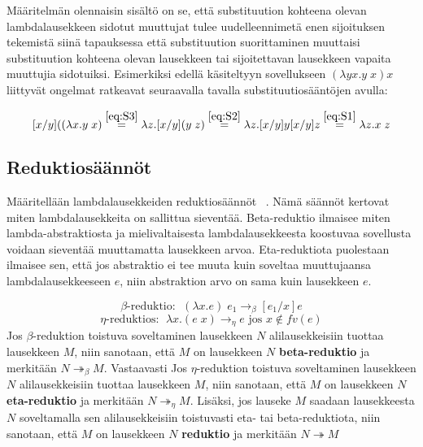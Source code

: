 Määritelmän olennaisin sisältö on se, että substituution kohteena olevan lambdalausekkeen sidotut muuttujat tulee uudelleennimetä enen sijoituksen tekemistä siinä tapauksessa että substituution suorittaminen muuttaisi substituution kohteena olevan lausekkeen tai sijoitettavan lausekkeen vapaita muuttujia sidotuiksi. Esimerkiksi edellä käsiteltyyn sovellukseen $(\lambda yx . y \; x) x$ liittyvät ongelmat ratkeavat seuraavalla tavalla substituutiosääntöjen avulla:

\[ [ x / y]((\lambda x . y \; x)  \stackrel{\eqref{eq:S3}}{=} \\ 
	\lambda z . [ x / y](y \; z) \stackrel{\eqref{eq:S2}}{=} \\
	\lambda z . [ x / y]y [ x / y]z \stackrel{\eqref{eq:S1}}{=} \lambda z . x \; z	
\]   

\par

\subsection{Reduktiosäännöt}

Määritellään lambdalausekkeiden reduktiosäännöt ~\cite[s.~9]{Hudak89}. Nämä säännöt kertovat miten lambdalausekkeita on sallittua sieventää. Beta-reduktio ilmaisee miten lambda-abstraktiosta ja mielivaltaisesta lambdalausekkeesta koostuvaa sovellusta voidaan sieventää muuttamatta lausekkeen arvoa. Eta-reduktiota puolestaan ilmaisee sen, että jos abstraktio ei tee muuta kuin soveltaa muuttujaansa lambdalausekkeeseen $e$, niin abstraktion arvo on sama kuin lausekkeen $e$.     

\begin{maar}[reduktiosäännöt]	
\[\beta \text{-reduktio: } \; (\lambda x.e )\; e_{1} \rightarrow_{\beta} [e_{1} / x]e \]
\[\eta \text{-reduktios: } \; \lambda x.(e \; x) \rightarrow_{\eta} e \text{ jos } x \notin fv(e) \]	
Jos $\beta$-reduktion toistuva soveltaminen lausekkeen $N$ alilausekkeisiin tuottaa lausekkeen $M$, niin sanotaan, että $M$ on lausekkeen $N$ \textbf{beta-reduktio} ja merkitään $N  \twoheadrightarrow_{\beta} M$. Vastaavasti Jos $\eta$-reduktion toistuva soveltaminen lausekkeen $N$ alilausekkeisiin tuottaa lausekkeen $M$, niin sanotaan, että $M$ on lausekkeen $N$ \textbf{eta-reduktio} ja merkitään $N  \twoheadrightarrow_{\eta} M$. Lisäksi, jos lauseke $M$ saadaan lausekkeesta $N$ soveltamalla sen alilausekkeisiin toistuvasti eta- tai beta-reduktiota, niin sanotaan, että $M$ on lausekkeen $N$ \textbf{reduktio} ja merkitään $N  \twoheadrightarrow M$        
\end{maar}

